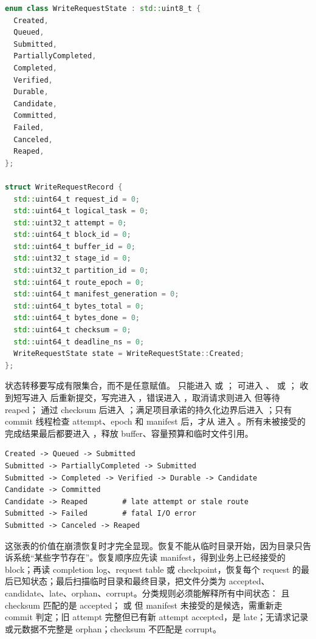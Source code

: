\begin{lstlisting}[language=C++,caption={可重放写请求记录的示例形态}]
enum class WriteRequestState : std::uint8_t {
  Created,
  Queued,
  Submitted,
  PartiallyCompleted,
  Completed,
  Verified,
  Durable,
  Candidate,
  Committed,
  Failed,
  Canceled,
  Reaped,
};

struct WriteRequestRecord {
  std::uint64_t request_id = 0;
  std::uint64_t logical_task = 0;
  std::uint32_t attempt = 0;
  std::uint64_t block_id = 0;
  std::uint64_t buffer_id = 0;
  std::uint32_t stage_id = 0;
  std::uint32_t partition_id = 0;
  std::uint64_t route_epoch = 0;
  std::uint64_t manifest_generation = 0;
  std::uint64_t bytes_total = 0;
  std::uint64_t bytes_done = 0;
  std::uint64_t checksum = 0;
  std::uint64_t deadline_ns = 0;
  WriteRequestState state = WriteRequestState::Created;
};
\end{lstlisting}

状态转移要写成有限集合，而不是任意赋值。 只能进入  或 ； 可进入 、 或 ； 收到短写进入  后重新提交，写完进入 ，错误进入 ，取消请求则进入  但等待 reaped； 通过 checksum 后进入 ；满足项目承诺的持久化边界后进入 ；只有 commit 线程检查 attempt、epoch 和 manifest 后，才从  进入 。所有未被接受的完成结果最后都要进入 ，释放 buffer、容量预算和临时文件引用。

\begin{lstlisting}[numbers=none,caption={状态转移不是布尔成功}]
Created -> Queued -> Submitted
Submitted -> PartiallyCompleted -> Submitted
Submitted -> Completed -> Verified -> Durable -> Candidate
Candidate -> Committed
Candidate -> Reaped        # late attempt or stale route
Submitted -> Failed        # fatal I/O error
Submitted -> Canceled -> Reaped
\end{lstlisting}

这张表的价值在崩溃恢复时才完全显现。恢复不能从临时目录开始，因为目录只告诉系统“某些字节存在”。恢复顺序应先读 manifest，得到业务上已经接受的 block；再读 completion log、request table 或 checkpoint，恢复每个 request 的最后已知状态；最后扫描临时目录和最终目录，把文件分类为 accepted、candidate、late、orphan、corrupt。分类规则必须能解释所有中间状态： 且 checksum 匹配的是 accepted； 或  但 manifest 未接受的是候选，需重新走 commit 判定；旧 attempt 完整但已有新 attempt accepted，是 late；无请求记录或元数据不完整是 orphan；checksum 不匹配是 corrupt。

